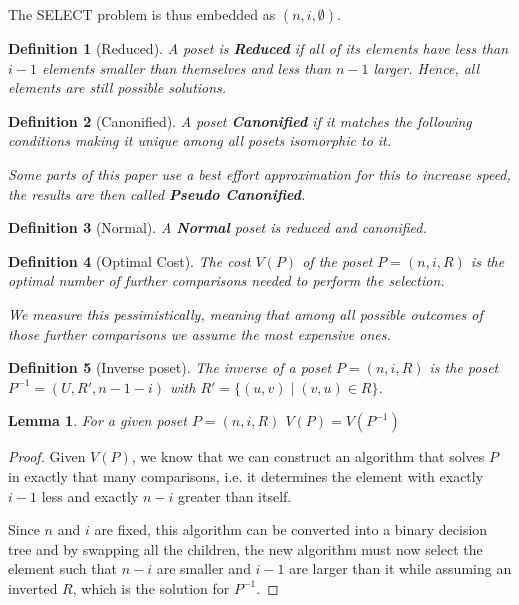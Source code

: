 \documentclass[10pt,journal,compsoc]{IEEEtran}
\newtheorem{lemma}{Lemma}
\newtheorem{definition}{Definition}
\begin{document}
The SELECT problem is thus embedded as $(n, i, \emptyset)$.

\begin{definition}[Reduced]
  A poset is \textbf{Reduced} if all of its elements have less than $i-1$ elements smaller than themselves and less than $n-1$ larger. Hence, all elements are still possible solutions.
\end{definition}
\begin{definition}[Canonified]
  A poset \textbf{Canonified} if it matches the following conditions making it unique among all posets isomorphic to it.

  Some parts of this paper use a best effort
  approximation for this to increase speed, the results are then called \textbf{Pseudo Canonified}.
\end{definition}
\begin{definition}[Normal]
  A \textbf{Normal} poset is reduced and canonified.
\end{definition}

\begin{definition}[Optimal Cost]
  The cost $V(P)$ of the poset $P = (n, i, R)$
  is the optimal number of further comparisons needed to
  perform the selection.

  We measure this pessimistically, meaning that among all
  possible outcomes of those further comparisons we assume
  the most expensive ones.
\end{definition}

\begin{definition}[Inverse poset] \label{definition:inverse_poset}
  The inverse of a poset $P=(n, i, R)$ is the poset $P^{-1}=(U,R',n-1-i)$ with $R' = \{(u,v) \; \vert \; (v,u) \in R\}$.
\end{definition}

\begin{lemma}
  For a given poset $P = (n, i, R)$ $V(P) = V(P^{-1})$
\end{lemma}

\begin{proof}
  Given $V(P)$, we know that we can construct an algorithm that
  solves $P$ in exactly that many comparisons, i.e. it determines
  the element with exactly $i-1$ less and exactly $n-i$ greater
  than itself.

  Since $n$ and $i$ are fixed, this algorithm can be converted into
  a binary decision tree and by swapping all the children, the new 
  algorithm must now select the element such that $n-i$ are smaller 
  and $i-1$ are larger than it while assuming an inverted $R$, which is 
  the solution for $P^{-1}$. 
\end{proof}
\end{document}
